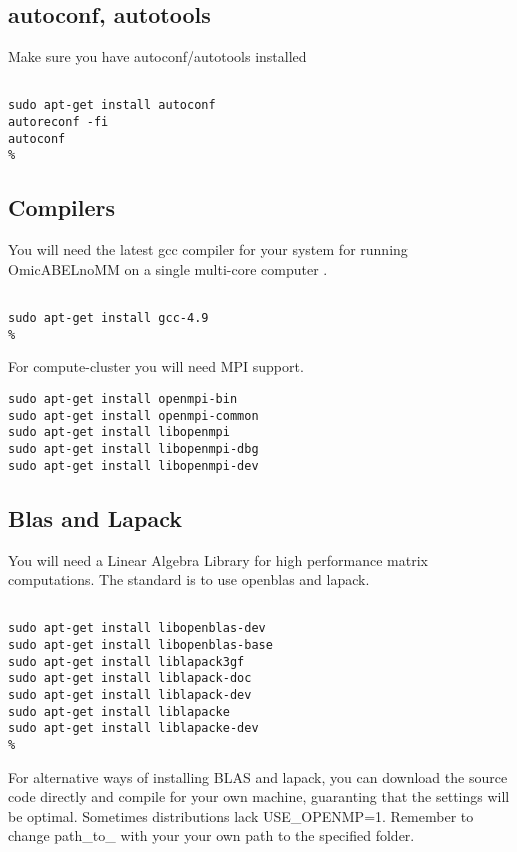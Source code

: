 \documentclass{report}
\begin{document}
\subsection{autoconf, autotools}

Make sure you have autoconf/autotools installed
\begin{lstlisting}[style=BASH,escapechar=\%]

sudo apt-get install autoconf
autoreconf -fi
autoconf
%
\end{lstlisting}

\subsection{Compilers}

You will need the latest gcc compiler for your system for running OmicABELnoMM on a single multi-core computer .

\begin{lstlisting}[style=BASH,escapechar=\%]

sudo apt-get install gcc-4.9
%
\end{lstlisting}

For compute-cluster you will need MPI support.

\begin{lstlisting}[style=BASH,escapechar=\%]
sudo apt-get install openmpi-bin
sudo apt-get install openmpi-common
sudo apt-get install libopenmpi
sudo apt-get install libopenmpi-dbg 
sudo apt-get install libopenmpi-dev
\end{lstlisting}

\subsection{Blas and Lapack}

You will need a Linear Algebra Library for high performance matrix computations.
The standard is to use openblas and lapack.

\begin{lstlisting}[style=BASH,escapechar=\%]

sudo apt-get install libopenblas-dev
sudo apt-get install libopenblas-base
sudo apt-get install liblapack3gf
sudo apt-get install liblapack-doc
sudo apt-get install liblapack-dev
sudo apt-get install liblapacke
sudo apt-get install liblapacke-dev
%
\end{lstlisting}

For alternative ways of installing BLAS and lapack, you can download the source code directly and compile for your own machine, guaranting that the settings will be optimal. Sometimes distributions lack USE\_OPENMP=1.
Remember to change path\_to\_ with your your own path to the specified folder.
\end{document}
